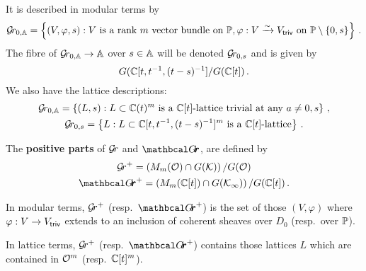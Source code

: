 \documentclass[draft]{article}
\begin{document}
% 
It is described in modular terms by 
$$
\Grbd = 
    \left\{ 
        (V,\varphi,s) : V\text{ is a rank $m$ vector bundle on }\PP, \varphi : V \xrightarrow{\sim} \Vtriv \text{ on } \PP \setminus \{0, s\}  
    \right\}\,. 
$$
% 
The fibre of $\Grbd \to \AA$ over $ s \in \AA $ will be denoted $ \Gr_{0,s} $ and is given by
% 
$$ 
    G(\CC[t, t^{-1}, (t-s)^{-1}]/G(\CC[t])\,. %
$$
% 
We also have the lattice descriptions:
% 
\begin{gather*}
\Grbd = 
    \left\{ 
        (L,s) : L \subset  \CC(t)^m\text{ is a $\CC[t]$-lattice trivial at any }a \ne 0, s 
    \right\}\,, \\
\Gr_{0,s} = 
    \left\{ 
        L : L \subset  \CC[t,t^{-1},(t-s)^{-1}]^m \text{ is a $\CC[t]$-lattice} 
    \right\}\,.
\end{gather*}
% 
\begin{definition} 
\label{def:grplus}
The \textbf{positive parts} of $\Gr $ and $\Grth$,  are defined by 
\begin{gather*}
    \Gr^+ = \left(M_m(\cO) \cap G(\cK)\right) / G(\cO) \\
    {\Grth}^+ = \left(M_m(\CC[t]) \cap G(\Kinf)\right) / G(\CC[t])\,. 
\end{gather*}
\end{definition}
% 
In modular terms, $\Gr^+$ (resp.\ ${\Grth}^+$) is the set of those $ (V, \varphi)$ where $ \varphi : V \rightarrow \Vtriv $ extends to an inclusion of coherent sheaves over $ D_0 $ (resp.\ over $ \PP$).

In lattice terms, $ \Gr^+$ (resp.\ ${\Grth}^+$) contains those lattices $L$ which are contained in $\cO^m$ (resp.\ $\CC[t]^m$).
% 
\end{document}
